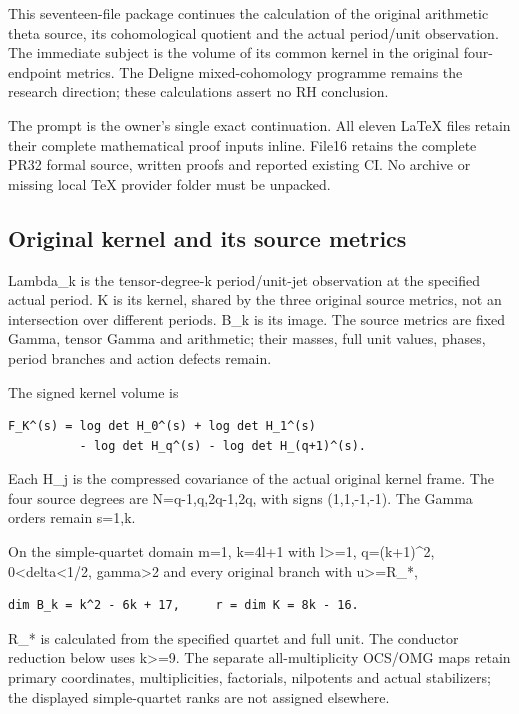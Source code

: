 \documentclass[
]{article}
\begin{document}
This seventeen-file package continues the calculation of the original
arithmetic theta source, its cohomological quotient and the actual
period/unit observation. The immediate subject is the volume of its
common kernel in the original four-endpoint metrics. The Deligne
mixed-cohomology programme remains the research direction; these
calculations assert no RH conclusion.

The prompt is the owner's single exact continuation. All eleven LaTeX
files retain their complete mathematical proof inputs inline. File16
retains the complete PR32 formal source, written proofs and reported
existing CI. No archive or missing local TeX provider folder must be
unpacked.

\subsection{Original kernel and its source
metrics}\label{original-kernel-and-its-source-metrics}

Lambda\_k is the tensor-degree-k period/unit-jet observation at the
specified actual period. K is its kernel, shared by the three original
source metrics, not an intersection over different periods. B\_k is its
image. The source metrics are fixed Gamma, tensor Gamma and arithmetic;
their masses, full unit values, phases, period branches and action
defects remain.

The signed kernel volume is

\begin{verbatim}
F_K^(s) = log det H_0^(s) + log det H_1^(s)
          - log det H_q^(s) - log det H_(q+1)^(s).
\end{verbatim}

Each H\_j is the compressed covariance of the actual original kernel
frame. The four source degrees are N=q-1,q,2q-1,2q, with signs
(1,1,-1,-1). The Gamma orders remain s=1,k.

On the simple-quartet domain m=1, k=4l+1 with l\textgreater=1,
q=(k+1)\^{}2, 0\textless delta\textless1/2, gamma\textgreater2 and every
original branch with \textbar u\textbar\textgreater=R\_*,

\begin{verbatim}
dim B_k = k^2 - 6k + 17,     r = dim K = 8k - 16.
\end{verbatim}

R\_* is calculated from the specified quartet and full unit. The
conductor reduction below uses k\textgreater=9. The separate
all-multiplicity OCS/OMG maps retain primary coordinates,
multiplicities, factorials, nilpotents and actual stabilizers; the
displayed simple-quartet ranks are not assigned elsewhere.
\end{document}
